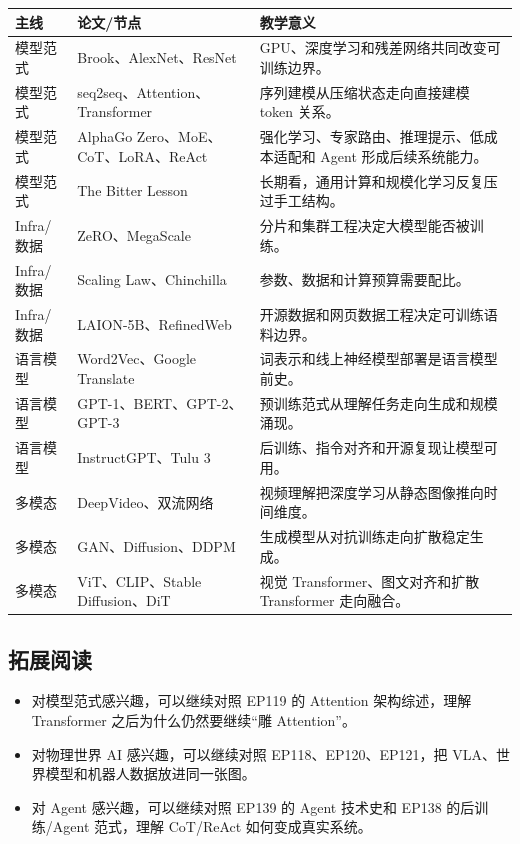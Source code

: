 \documentclass[a4paper]{article}
\begin{document}
\begin{longtable}{p{}p{}p{}}
\toprule
主线 & 论文/节点 & 教学意义 \\
\midrule
模型范式 & Brook、AlexNet、ResNet & GPU、深度学习和残差网络共同改变可训练边界。 \\
模型范式 & seq2seq、Attention、Transformer & 序列建模从压缩状态走向直接建模 token 关系。 \\
模型范式 & AlphaGo Zero、MoE、CoT、LoRA、ReAct & 强化学习、专家路由、推理提示、低成本适配和 Agent 形成后续系统能力。 \\
模型范式 & The Bitter Lesson & 长期看，通用计算和规模化学习反复压过手工结构。 \\
Infra/数据 & ZeRO、MegaScale & 分片和集群工程决定大模型能否被训练。 \\
Infra/数据 & Scaling Law、Chinchilla & 参数、数据和计算预算需要配比。 \\
Infra/数据 & LAION-5B、RefinedWeb & 开源数据和网页数据工程决定可训练语料边界。 \\
语言模型 & Word2Vec、Google Translate & 词表示和线上神经模型部署是语言模型前史。 \\
语言模型 & GPT-1、BERT、GPT-2、GPT-3 & 预训练范式从理解任务走向生成和规模涌现。 \\
语言模型 & InstructGPT、Tulu 3 & 后训练、指令对齐和开源复现让模型可用。 \\
多模态 & DeepVideo、双流网络 & 视频理解把深度学习从静态图像推向时间维度。 \\
多模态 & GAN、Diffusion、DDPM & 生成模型从对抗训练走向扩散稳定生成。 \\
多模态 & ViT、CLIP、Stable Diffusion、DiT & 视觉 Transformer、图文对齐和扩散 Transformer 走向融合。 \\
\bottomrule
\end{longtable}

\subsection{拓展阅读}

\begin{itemize}
\item 对模型范式感兴趣，可以继续对照 EP119 的 Attention 架构综述，理解 Transformer 之后为什么仍然要继续“雕 Attention”。
\item 对物理世界 AI 感兴趣，可以继续对照 EP118、EP120、EP121，把 VLA、世界模型和机器人数据放进同一张图。
\item 对 Agent 感兴趣，可以继续对照 EP139 的 Agent 技术史和 EP138 的后训练/Agent 范式，理解 CoT/ReAct 如何变成真实系统。
\end{itemize}
\end{document}
